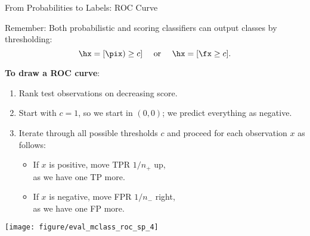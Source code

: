 \documentclass[11pt,compress,t,notes=noshow, xcolor=table]{beamer}
\begin{document}
\begin{vbframe}{From Probabilities to Labels: ROC Curve}

Remember: Both probabilistic and scoring classifiers can output classes by 
thresholding:
$$\hx = [\pix) \ge c] \quad \text{ or } \quad \hx = [\fx \ge c].$$


\textbf{To draw a ROC curve}:

\lz

\begin{minipage}[b]{0.65\textwidth}
  \footnotesize
  \begin{enumerate}
    \item Rank test observations on decreasing score.
    \item Start with $c = 1$, so we start in $(0, 0)$; we predict everything as
    negative.
    \item Iterate through all possible thresholds $c$ and proceed for each
    observation $x$ as follows:
    \begin{itemize}
      \footnotesize
      \item If $x$ is positive, move TPR $1/n_+$ up, \\as we have one TP more.
      \item If $x$ is negative, move FPR $1/n_-$ right, \\as we have one FP 
      more.
    \end{itemize}
  \end{enumerate}
\end{minipage}%
\begin{minipage}[b]{0.35\textwidth}
  \centering
  \texttt{[image: figure/eval\_mclass\_roc\_sp\_4]}
\end{minipage}

\end{vbframe}

\end{document}
